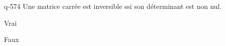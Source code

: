 \begin{truefalse}{q-574}
Une matrice carrée est inversible ssi son déterminant est non nul.
\item* Vrai
\item Faux
\end{truefalse}

